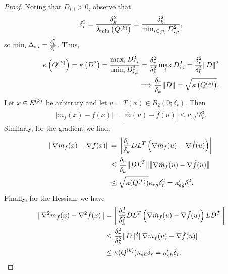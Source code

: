 \documentclass{article}
\begin{document}
\begin{proof}
Noting that $D_{i, i} > 0$, observe that
\begin{align*}
\delta_r^2 = \frac {\delta_k^2} {\lambda_{\text{min}}\left({Q^{(k)}}\right)} = \frac {\delta_k^2} {\min_{i \in [n]} D^2_{i, i}},
\end{align*}
so $\min_{i} \Delta_{i, i} = \frac{\delta_k^2}{\delta_r^2}$.
Thus,
\begin{align*}
{\kappa}\left({Q^{(k)}}\right) 
= \kappa\left(D^2\right) 
= \frac{\max_{i}D_{i,i}^2}{\min_{i}D_{i,i}^2} 
= \frac{\delta_r^2}{\delta_k^2} \max_{i}D_{i,i}^2 = \frac{\delta_r^2}{\delta_k^2}\|D\|^2 \\
\Longrightarrow \frac{\delta_r} {\delta_k} \|D\| = \sqrt{{\kappa}\left({Q^{(k)}}\right)}.
\end{align*}
Let $x \in {E^{(k)}}$ be arbitrary and let $u = T(x) \in B_2(0;\delta_r)$.
Then
\begin{align*}
 | m_f(x) - f(x)| = |\hat m(u) - \hat f(u)| \le \kappa_{ef}'\delta_r^3.
\end{align*}
Similarly, for the gradient we find:
\begin{align*}
\| \nabla m_f(x) - \nabla f(x)\| &= \left\|\frac{\delta_r} {\delta_k}DL^T\left(\nabla\hat m_f(u) - \nabla \hat f(u)\right)\right\| \\
& \le \frac{\delta_r} {\delta_k} \|DL^T\|\|\nabla \hat m_f(u) - \nabla \hat f(u)\| \\
& \le \sqrt{{\kappa}({Q^{(k)}})}\kappa_{eg} \delta_r^2 = \kappa_{eg}' \delta_r^2.
\end{align*}
Finally,  for the Hessian, we have
\begin{align*}
\| \nabla^2 m_f(x) - \nabla^2 f(x)\| & = \left\|\frac{\delta_r^2} {\delta_k^2}DL^T\left(\nabla\hat m_f(u) - \nabla \hat f(u)\right)LD^T\right\| \\
& \le \frac{\delta_r^2} {\delta_k^2} \|D\|^2\|\nabla \hat m_f(u) - \nabla \hat f(u)\| \\
& \le {\kappa}({Q^{(k)}})\kappa_{eh} \delta_r = \kappa_{eh}' \delta_r.
\end{align*}

\end{proof}
\end{document}
